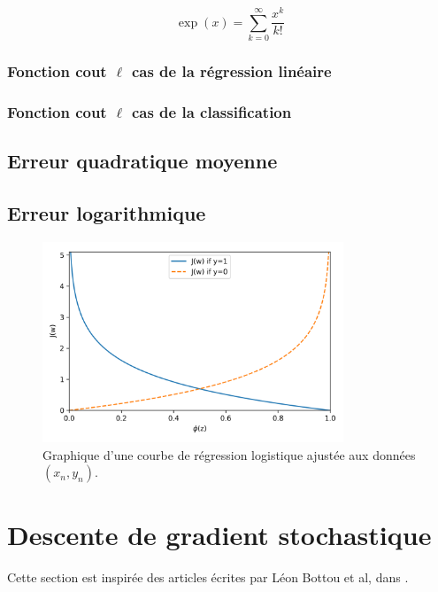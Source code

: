 	\[\exp(x)=\sum_{k=0}^{\infty}\frac{x^k}{k!}\]
	\lipsum[4]
	\subsubsection{Fonction cout $\ell$ cas de la régression linéaire}
	\lipsum[1]
	\subsubsection{Fonction cout $\ell$ cas  de la classification}
	\lipsum[1]
	
	\subsection{Erreur quadratique moyenne }
	\lipsum[1] %
	\subsection{Erreur logarithmique}
	\lipsum[1]
	\begin{figure}[hth]%
		\centering
		\includegraphics[width=9cm]{images/minimum_log_curve.png}
		\caption{Graphique d'une courbe de régression logistique ajustée aux données $(x_n , y_n)$. \cite[image de]{ml2008python}
		}
		\label{fig:minimum_log_curve}
	\end{figure}
	
	
	
	
	\section{Descente de gradient stochastique}
	Cette section est inspirée des articles écrites par Léon Bottou et al, dans  \cite{bottou2012stochastic} 
	\cite{bottou2010large}
	\cite{framling2004scaled}
	\cite{bottou2018optimization}
	\cite{netrapalli2019stochastic}
	\cite{wijnhoven2010fast}.
	
